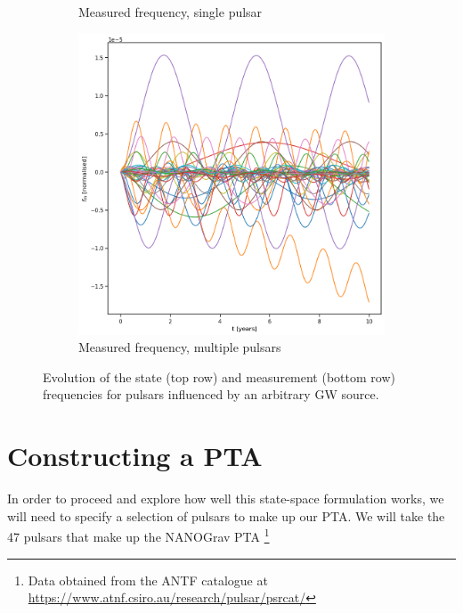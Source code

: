 \documentclass{tufte-handout} %
\begin{document}
\begin{figure}
\begin{subfigure}[b]{0.475\textwidth}
		\caption{Measured frequency, single pulsar}  
		\label{fig:mean and std of net34}
	\end{subfigure}
	\hfill
	\begin{subfigure}[b]{0.475\textwidth}   
		\centering 
		\includegraphics[width=\textwidth]{images/fm_all}
		\caption{Measured frequency, multiple pulsars}   
		\label{fig:mean and std of net44}
	\end{subfigure}
	\caption{Evolution of the state (top row) and measurement (bottom row) frequencies for pulsars influenced by an arbitrary GW source.}
	\label{fig:mean and std of nets}
\end{figure}


\newpage
\section{Constructing a PTA}\label{sec:PTA}


In order to proceed and explore how well this state-space formulation works, we will need to specify a selection of pulsars to make up our PTA. We will take the 47 pulsars that make up the NANOGrav PTA \footnote{Data obtained from the ANTF catalogue at \url{https://www.atnf.csiro.au/research/pulsar/psrcat/}} \newline  
\end{document}
